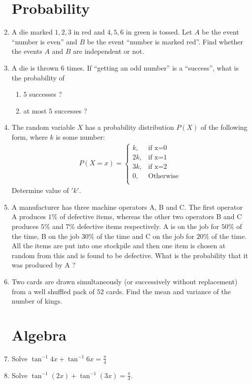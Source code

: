 \documentclass{article}
\begin{document}
\begin{enumerate}
\section{Probability}
\item A die marked $ 1, 2, 3$ in red and $4, 5, 6$ in green is tossed. Let $A$ be the event “number is even” and $B$ be the event “number is marked red”. Find whether the events $A$ and $B$ are independent or not.
\item A die is thrown $6$ times. If “getting an odd number” is a “success”, what is the probability of 
\begin{enumerate}
    \item $5$ successes ?
    \item at most $5$ successes ? 
\end{enumerate} 
\item The random variable $X$ has a probability distribution $P(X)$ of the following form, where $k$ is some number:
\begin{align*}
P(X = x) = 
\begin{cases}
    k , & \text{if x=0} \\
    2k , & \text{if x=1} \\
    3k , & \text{if x=2} \\
    0 , & \text{Otherwise} \\      
\end{cases}
\end{align*}
 Determine value of $'k'$.
 \item A manufacturer has three machine operators A, B and C. The first operator A produces $1\%$ of defective items, whereas the other two operators B and C produces $5\%$ and $7\%$ defective items respectively. A is on the job for $50\%$ of the time, B on the job $30\%$ of the time and C on the job for $20\%$ of the time. All the items are put into one stockpile and then one item is chosen at random from this and is found to be defective. What is the probability that it was produced by A ?
\item Two cards are drawn simultaneously (or successively without replacement) from a well shuffled pack of $52$ cards. Find the mean and variance of the number of kings.
\section{Algebra}
\item Solve ${\tan^{-1}4x}+{\tan^{-1}6x} = \frac{\pi}{4}$
\item Solve ${\tan^{-1}(2x)}+{\tan^{-1}(3x)} = \frac{\pi}{4}$.

\end{enumerate}
\end{document}
